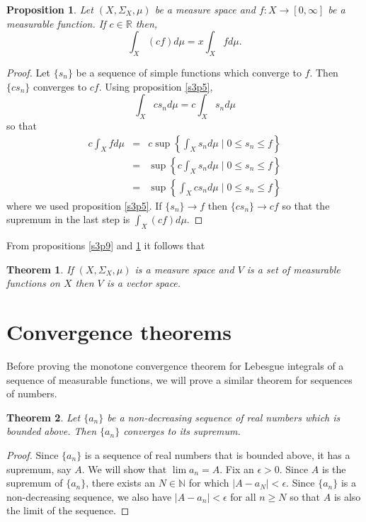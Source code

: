 \documentclass{article}
\newcommand{\sor}{\mathbb{R}}
\newcommand{\son}{\mathbb{N}}
\theoremstyle{plain}
\newtheorem{thm}{Theorem}
\numberwithin{thm}{section}
\theoremstyle{plain}
\newtheorem{prop}{Proposition}
\numberwithin{prop}{section}
\theoremstyle{definition}
\numberwithin{defn}{section}
\theoremstyle{remark}
\theoremstyle{plain}
\numberwithin{cor}{section}
\numberwithin{equation}{section}
\begin{document}
\begin{prop}\label{s3p15}
Let $(X, \Sigma_X, \mu)$ be a measure space and $f: X \rightarrow [0, \infty]$
be a measurable function. If $c \in \sor$ then,
\[
\int_X (cf) d\mu = x\int_X fd\mu.
\]
\end{prop}
\begin{proof}
Let $\{s_n\}$ be a sequence of simple functions which converge to $f$. Then
$\{c s_n\}$ converges to $cf$. Using proposition \ref{s3p5},
\[
\int_X cs_n d\mu = c\int_X s_n d\mu
\]
so that
\begin{eqnarray*}
c\int_X f d\mu &=& 
    c\sup\left\{\int_X s_n d\mu\;|\; 0 \le s_n \le f\right\} \\
&=& \sup\left\{c\int_X s_n d\mu\;|\; 0 \le s_n \le f\right\} \\
&=& \sup\left\{\int_X cs_n d\mu\;|\; 0 \le s_n \le f\right\}
\end{eqnarray*}
where we used proposition \ref{s3p5}. If $\{s_n\} \rightarrow f$ then
$\{cs_n\} \rightarrow cf$  so that the supremum in the last step is
$\int_X (cf)d\mu$.
\end{proof}

From propositions \ref{s3p9} and \ref{s3p15} it follows that 
\begin{thm}\label{s3t1}
If $(X, \Sigma_X, \mu)$ is a measure space and $V$ is a set of measurable
functions on $X$ then $V$ is a vector space.
\end{thm}

\section{Convergence theorems}\label{c4}
Before proving the monotone convergence theorem for Lebesgue integrals of a
sequence of measurable functions, we will prove a similar theorem for sequences
of numbers.
\begin{thm}\label{c4t1}
Let $\{a_n\}$ be a non-decreasing sequence of real numbers which is bounded 
above. Then $\{a_n\}$ converges to its supremum.
\end{thm}
\begin{proof}
Since $\{a_n\}$ is a sequence of real numbers that is bounded above, it has a
supremum, say $A$. We will show that $\lim a_n = A$. Fix an $\epsilon > 0$.
Since $A$ is the supremum of $\{a_n\}$, there exists an $N \in \son$ for which
$|A - a_N| < \epsilon$. Since $\{a_n\}$ is a non-decreasing sequence, we also
have $|A - a_n| < \epsilon$ for all $n \ge N$ so that $A$ is also the limit of
the sequence.
\end{proof}
\end{document}
